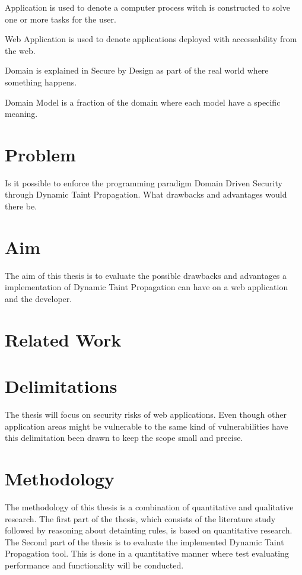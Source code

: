 \begin{definition}{Application} 
	is used to denote a computer process witch is constructed to solve one or more tasks for the user.
\end{definition}

\begin{definition}{Web Application} 
	is used to denote applications deployed with accessability from the web.
\end{definition}

\begin{definition}{Domain}
	is explained in Secure by Design \parencite{sbd2018} as part of the real world where something happens.
\end{definition}

\begin{definition}{Domain Model}
	is a fraction of the domain where each model have a specific meaning.
\end{definition}


\section{Problem}
Is it possible to enforce the programming paradigm Domain Driven Security through Dynamic Taint Propagation. What drawbacks and advantages would there be.  


\section{Aim}
The aim of this thesis is to evaluate the possible drawbacks and advantages a implementation of Dynamic Taint Propagation can have on a web application and the developer.


\section{Related Work}


\section{Delimitations}
The thesis will focus on security risks of web applications. Even though other application areas might be vulnerable to the same kind of vulnerabilities have this delimitation been drawn to keep the scope small and precise.


\section{Methodology}
The methodology of this thesis is a combination of quantitative and qualitative research. The first part of the thesis, which consists of the literature study followed by reasoning about detainting rules, is based on quantitative research. The Second part of the thesis is to evaluate the implemented Dynamic Taint Propagation tool. This is done in a quantitative manner where test evaluating performance and functionality will be conducted.

